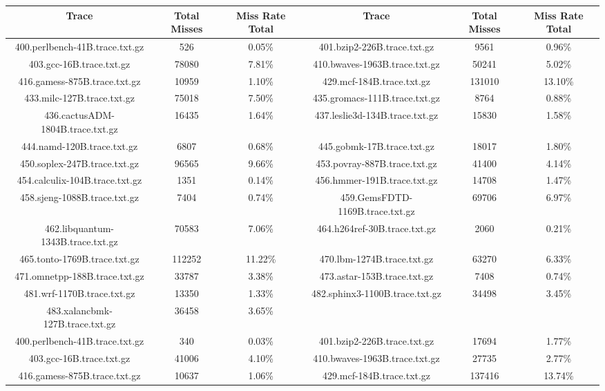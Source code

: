 \begin{table}[H]
\centering
\begin{tabular}{|c|c|c|c|c|c|}
\hline
Trace & Total Misses & Miss Rate Total & Trace & Total Misses & Miss Rate Total \\
\hline
400.perlbench-41B.trace.txt.gz & 526 & 0.05\% & 401.bzip2-226B.trace.txt.gz & 9561 & 0.96\% \\\hline
403.gcc-16B.trace.txt.gz & 78080 & 7.81\% & 410.bwaves-1963B.trace.txt.gz & 50241 & 5.02\% \\\hline
416.gamess-875B.trace.txt.gz & 10959 & 1.10\% & 429.mcf-184B.trace.txt.gz & 131010 & 13.10\% \\\hline
433.milc-127B.trace.txt.gz & 75018 & 7.50\% & 435.gromacs-111B.trace.txt.gz & 8764 & 0.88\% \\\hline
436.cactusADM-1804B.trace.txt.gz & 16435 & 1.64\% & 437.leslie3d-134B.trace.txt.gz & 15830 & 1.58\% \\\hline
444.namd-120B.trace.txt.gz & 6807 & 0.68\% & 445.gobmk-17B.trace.txt.gz & 18017 & 1.80\% \\\hline
450.soplex-247B.trace.txt.gz & 96565 & 9.66\% & 453.povray-887B.trace.txt.gz & 41400 & 4.14\% \\\hline
454.calculix-104B.trace.txt.gz & 1351 & 0.14\% & 456.hmmer-191B.trace.txt.gz & 14708 & 1.47\% \\\hline
458.sjeng-1088B.trace.txt.gz & 7404 & 0.74\% & 459.GemsFDTD-1169B.trace.txt.gz & 69706 & 6.97\% \\\hline
462.libquantum-1343B.trace.txt.gz & 70583 & 7.06\% & 464.h264ref-30B.trace.txt.gz & 2060 & 0.21\% \\\hline
465.tonto-1769B.trace.txt.gz & 112252 & 11.22\% & 470.lbm-1274B.trace.txt.gz & 63270 & 6.33\% \\\hline
471.omnetpp-188B.trace.txt.gz & 33787 & 3.38\% & 473.astar-153B.trace.txt.gz & 7408 & 0.74\% \\\hline
481.wrf-1170B.trace.txt.gz & 13350 & 1.33\% & 482.sphinx3-1100B.trace.txt.gz & 34498 & 3.45\% \\\hline
483.xalancbmk-127B.trace.txt.gz & 36458 & 3.65\% & & & &  \\\hline
400.perlbench-41B.trace.txt.gz & 340 & 0.03\% & 401.bzip2-226B.trace.txt.gz & 17694 & 1.77\% \\\hline
403.gcc-16B.trace.txt.gz & 41006 & 4.10\% & 410.bwaves-1963B.trace.txt.gz & 27735 & 2.77\% \\\hline
416.gamess-875B.trace.txt.gz & 10637 & 1.06\% & 429.mcf-184B.trace.txt.gz & 137416 & 13.74\% \\\hline

\end{tabular}
\end{table}

